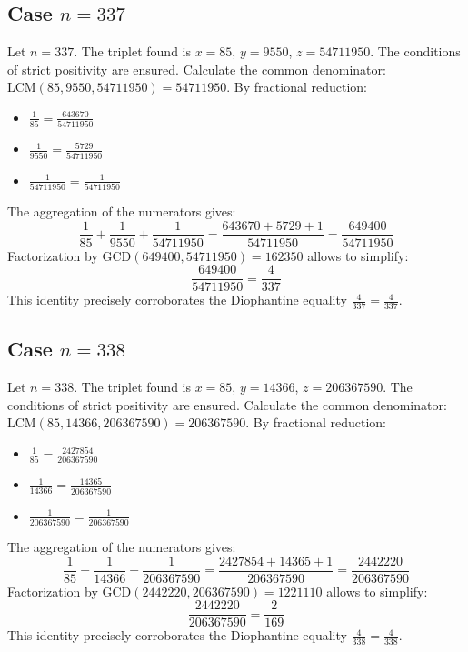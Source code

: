 \documentclass[11pt,a4paper]{article}
\begin{document}
\subsection{Case $n = 337$}
Let $n = 337$. The triplet found is $x = 85$, $y = 9550$, $z = 54711950$.
The conditions of strict positivity are ensured.
Calculate the common denominator: $\text{LCM}(85, 9550, 54711950) = 54711950$.
By fractional reduction:
\begin{itemize}
    \item $\frac{1}{85} = \frac{643670}{54711950}$
    \item $\frac{1}{9550} = \frac{5729}{54711950}$
    \item $\frac{1}{54711950} = \frac{1}{54711950}$
\end{itemize}
The aggregation of the numerators gives:
$$ \frac{1}{85} + \frac{1}{9550} + \frac{1}{54711950} = \frac{643670 + 5729 + 1}{54711950} = \frac{649400}{54711950} $$
Factorization by $\text{GCD}(649400, 54711950) = 162350$ allows to simplify:
$$ \frac{649400}{54711950} = \frac{4}{337} $$
This identity precisely corroborates the Diophantine equality $\frac{4}{337} = \frac{4}{337}$.

\subsection{Case $n = 338$}
Let $n = 338$. The triplet found is $x = 85$, $y = 14366$, $z = 206367590$.
The conditions of strict positivity are ensured.
Calculate the common denominator: $\text{LCM}(85, 14366, 206367590) = 206367590$.
By fractional reduction:
\begin{itemize}
    \item $\frac{1}{85} = \frac{2427854}{206367590}$
    \item $\frac{1}{14366} = \frac{14365}{206367590}$
    \item $\frac{1}{206367590} = \frac{1}{206367590}$
\end{itemize}
The aggregation of the numerators gives:
$$ \frac{1}{85} + \frac{1}{14366} + \frac{1}{206367590} = \frac{2427854 + 14365 + 1}{206367590} = \frac{2442220}{206367590} $$
Factorization by $\text{GCD}(2442220, 206367590) = 1221110$ allows to simplify:
$$ \frac{2442220}{206367590} = \frac{2}{169} $$
This identity precisely corroborates the Diophantine equality $\frac{4}{338} = \frac{4}{338}$.
\end{document}
